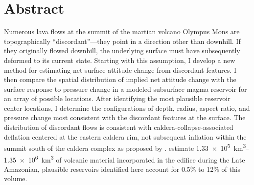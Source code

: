 \chapter{Abstract}
Numerous lava flows at the summit of the martian volcano Olympus Mons are topographically ``discordant''---they point in a direction other than downhill. If they originally flowed downhill, the underlying surface must have subsequently deformed to its current state. Starting with this assumption, I develop a new method for estimating net surface attitude change from discordant features. I then compare the spatial distribution of implied net attitude change with the surface response to pressure change in a modeled subsurface magma reservoir for an array of possible locations. After identifying the most plausible reservoir center locations, I determine the configurations of depth, radius, aspect ratio, and pressure change most consistent with the discordant features at the surface. The distribution of discordant flows is consistent with caldera-collapse-associated deflation centered at the eastern caldera rim, not subsequent inflation within the summit south of the caldera complex as proposed by \textcite{mouginis-mark_late-stage_2019}. \textcite{chadwick_late_2015} estimate \qtyrange{1.33e5}{1.35e6}{\km\cubed} of volcanic material incorporated in the edifice during the Late Amazonian, plausible reservoirs identified here account for 0.5\% to 12\% of this volume.